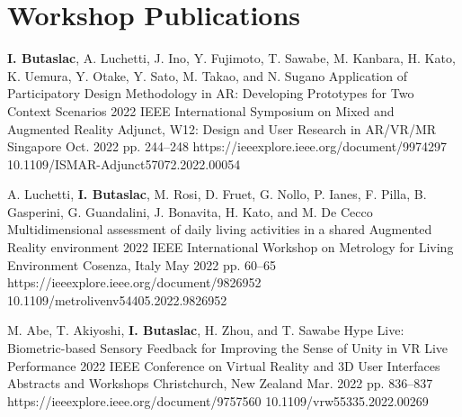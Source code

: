 \section{Workshop Publications}

\cvWorkshopListStart
\cvConference
{\textbf{I. Butaslac}, A. Luchetti, J. Ino, Y. Fujimoto, T. Sawabe, M. Kanbara, H. Kato, K. Uemura, Y. Otake, Y. Sato, M. Takao, and N. Sugano}
{Application of Participatory Design Methodology in AR: Developing Prototypes for Two Context Scenarios}
{2022 IEEE International Symposium on Mixed and Augmented Reality Adjunct, W12: Design and User Research in AR/VR/MR}
{Singapore}
{Oct. 2022}
{pp. 244--248}
{https://ieeexplore.ieee.org/document/9974297}
{10.1109/ISMAR-Adjunct57072.2022.00054}

\cvConference
{A. Luchetti, \textbf{I. Butaslac}, M. Rosi, D. Fruet, G. Nollo, P. Ianes, F. Pilla, B. Gasperini, G. Guandalini, J. Bonavita, H. Kato, and M. De Cecco}
{Multidimensional assessment of daily living activities in a shared Augmented Reality environment}
{2022 IEEE International Workshop on Metrology for Living Environment}
{Cosenza, Italy}
{May 2022}
{pp. 60--65}
{https://ieeexplore.ieee.org/document/9826952}
{10.1109/metrolivenv54405.2022.9826952}

\cvConference
{M. Abe, T. Akiyoshi, \textbf{I. Butaslac}, H. Zhou, and T. Sawabe}
{Hype Live: Biometric-based Sensory Feedback for Improving the Sense of Unity in VR Live Performance}
{2022 IEEE Conference on Virtual Reality and 3D User Interfaces Abstracts and Workshops}
{Christchurch, New Zealand}
{Mar. 2022}
{pp. 836--837}
{https://ieeexplore.ieee.org/document/9757560}
{10.1109/vrw55335.2022.00269}
\cvWorkshopListEnd